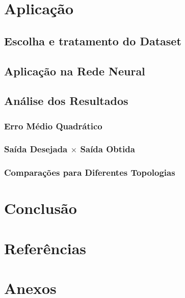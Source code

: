 \documentclass[12pt,a4paper]{article}
\begin{document}
\section{Aplicação}
\subsection{Escolha e tratamento do Dataset}
\subsection{Aplicação na Rede Neural}
\subsection{Análise dos Resultados}
\subsubsection{Erro Médio Quadrático}
\subsubsection{Saída Desejada $\times$ Saída Obtida}
\subsubsection{Comparações para Diferentes Topologias}
\section{Conclusão}
\section{Referências}
\section{Anexos}
\end{document}
